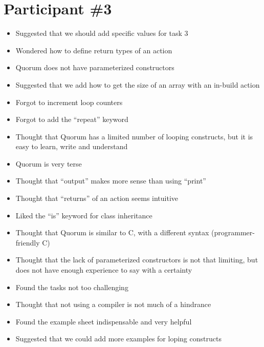 \section{Participant {\#}3}
\begin{itemize}
\item Suggested that we should add specific values for task 3
\item Wondered how to define return types of an action
\item Quorum does not have parameterized constructors
\item Suggested that we add how to get the size of an array with an in-build action
\item Forgot to increment loop counters
\item Forgot to add the “repeat” keyword
\item Thought that Quorum has a limited number of looping constructs, but it is easy to learn, write and understand
\item Quorum is very terse
\item Thought that “output” makes more sense than using “print”
\item Thought that “returns” of an action seems intuitive
\item Liked the “is” keyword for class inheritance
\item Thought that Quorum is similar to C, with a different syntax (programmer-friendly C) 
\item Thought that the lack of parameterized constructors is not that limiting, but does not have enough experience to say with a certainty
\item Found the tasks not too challenging 
\item Thought that not using a compiler is not much of a hindrance
\item Found the example sheet indispensable and very helpful
\item Suggested that we could add more examples for loping constructs
\end{itemize}
